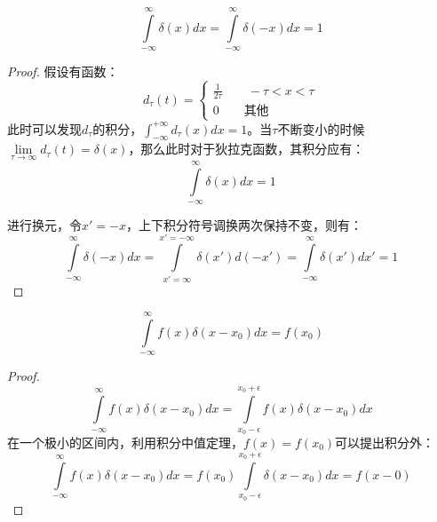 \documentclass[11pt]{article}
\begin{document}
\begin{corollary}
    \begin{equation*}
        \int\limits^{\infty}_{-\infty} \delta(x) dx =
        \int\limits^{\infty}_{-\infty} \delta(-x) dx = 1
    \end{equation*}
\end{corollary}

\begin{proof}
    假设有函数：
    \begin{equation*}
        d_\tau(t) = 
        \begin{cases}
            \frac{1}{2\tau} \qquad -\tau<x<\tau \\
            0 \qquad \text{其他}
        \end{cases}
    \end{equation*}
    此时可以发现$d_\tau$的积分，$\int^{+\infty}_{-\infty} d_\tau(x) dx = 1$。当$\tau$不断变小的时候$\lim\limits_{\tau \rightarrow \infty} d_{\tau}(t) = \delta(x)$，那么此时对于狄拉克函数，其积分应有：
    \begin{equation*}
        \int\limits^{\infty}_{-\infty} \delta(x) dx =1
    \end{equation*}

    进行换元，令$x'=-x$，上下积分符号调换两次保持不变，则有：
    \begin{equation*}
        \int\limits^{\infty}_{-\infty} \delta(-x) dx =
        \int\limits^{x'= -\infty}_{x'= \infty} \delta(x') d(-x') =
        \int\limits^{\infty}_{-\infty} \delta(x') dx' = 1
    \end{equation*}
\end{proof}

\begin{corollary}
    \begin{equation*}
        \int\limits^{\infty}_{-\infty} f(x) \delta(x-x_0) dx = f(x_0)
    \end{equation*}
\end{corollary}

\begin{proof}
    \begin{equation*}
        \int\limits^{\infty}_{-\infty} f(x) \delta(x-x_0) dx
        = \int\limits^{x_0+\epsilon}_{x_0-\epsilon} f(x) \delta(x-x_0) dx
    \end{equation*}
    在一个极小的区间内，利用积分中值定理，$f(x)=f(x_0)$可以提出积分外：
    \begin{equation*}
        \int\limits^{\infty}_{-\infty} f(x) \delta(x-x_0) dx
        = f(x_0)\int\limits^{x_0+\epsilon}_{x_0-\epsilon} \delta(x-x_0) dx
        = f(x-0)
    \end{equation*}
\end{proof}
\end{document}
